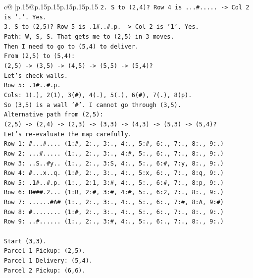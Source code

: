 \documentclass{article}
\begin{document}
{\begin{supertabular}{c@{$\;$}|p{.15\linewidth}@{}p{.15\linewidth}p{.15\linewidth}p{.15\linewidth}p{.15\linewidth}p{.15\linewidth}}
{{{\texttt{2. S to (2,4)? Row 4 is ...\#..... {-}> Col 2 is '.'. Yes.} \\
\texttt{3. S to (2,5)? Row 5 is .1\#..\#.p. {-}> Col 2 is '1'. Yes.} \\
\texttt{Path: W, S, S. That gets me to (2,5) in 3 moves.} \\
\texttt{Then I need to go to (5,4) to deliver.} \\
\texttt{From (2,5) to (5,4):} \\
\texttt{(2,5) {-}> (3,5) {-}> (4,5) {-}> (5,5) {-}> (5,4)?} \\
\texttt{Let's check walls.} \\
\texttt{Row 5: .1\#..\#.p.} \\
\texttt{Cols: 1(.), 2(1), 3(\#), 4(.), 5(.), 6(\#), 7(.), 8(p).} \\
\texttt{So (3,5) is a wall '\#'. I cannot go through (3,5).} \\
\texttt{Alternative path from (2,5):} \\
\texttt{(2,5) {-}> (2,4) {-}> (2,3) {-}> (3,3) {-}> (4,3) {-}> (5,3) {-}> (5,4)?} \\
\texttt{Let's re{-}evaluate the map carefully.} \\
\texttt{Row 1: \#...\#.... (1:\#, 2:., 3:., 4:., 5:\#, 6:., 7:., 8:., 9:.)} \\
\texttt{Row 2: ...\#..... (1:., 2:., 3:., 4:\#, 5:., 6:., 7:., 8:., 9:.)} \\
\texttt{Row 3: ..S..\#y.. (1:., 2:., 3:S, 4:., 5:., 6:\#, 7:y, 8:., 9:.)} \\
\texttt{Row 4: \#...x..q. (1:\#, 2:., 3:., 4:., 5:x, 6:., 7:., 8:q, 9:.)} \\
\texttt{Row 5: .1\#..\#.p. (1:., 2:1, 3:\#, 4:., 5:., 6:\#, 7:., 8:p, 9:.)} \\
\texttt{Row 6: B\#\#\#.2... (1:B, 2:\#, 3:\#, 4:\#, 5:., 6:2, 7:., 8:., 9:.)} \\
\texttt{Row 7: ......\#A\# (1:., 2:., 3:., 4:., 5:., 6:., 7:\#, 8:A, 9:\#)} \\
\texttt{Row 8: \#........ (1:\#, 2:., 3:., 4:., 5:., 6:., 7:., 8:., 9:.)} \\
\texttt{Row 9: ..\#...... (1:., 2:., 3:\#, 4:., 5:., 6:., 7:., 8:., 9:.)} \\
\\ 
\texttt{Start (3,3).} \\
\texttt{Parcel 1 Pickup: (2,5).} \\
\texttt{Parcel 1 Delivery: (5,4).} \\
\texttt{Parcel 2 Pickup: (6,6).} \\
}}}
\end{supertabular}}
\end{document}
